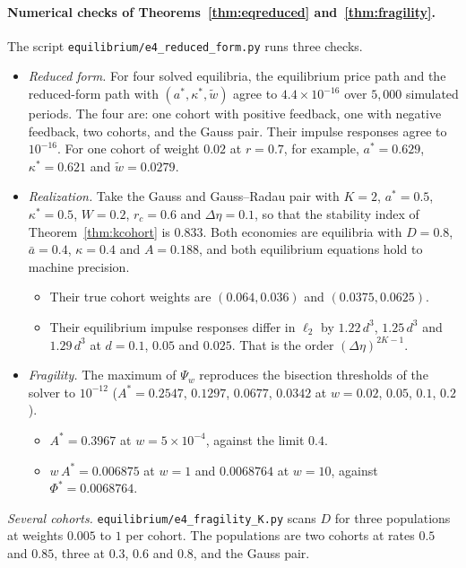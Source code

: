 \documentclass[12pt]{article}
\theoremstyle{definition}
\theoremstyle{remark}
\begin{document}
\paragraph{Numerical checks of Theorems~\ref{thm:eqreduced} and~\ref{thm:fragility}.} The script \nolinkurl{equilibrium/e4_reduced_form.py} runs three checks.
\begin{itemize}[itemsep=1pt,topsep=2pt]
\item \emph{Reduced form.} For four solved equilibria, the equilibrium price path and the reduced-form path with $(a^*,\kappa^*,\tilde w)$ agree to $4.4\times10^{-16}$ over $5{,}000$ simulated periods. The four are: one cohort with positive feedback, one with negative feedback, two cohorts, and the Gauss pair. Their impulse responses agree to $10^{-16}$. For one cohort of weight $0.02$ at $r=0.7$, for example, $a^*=0.629$, $\kappa^*=0.621$ and $\tilde w=0.0279$.
\item \emph{Realization.} Take the Gauss and Gauss--Radau pair with $K=2$, $a^*=0.5$, $\kappa^*=0.5$, $W=0.2$, $r_c=0.6$ and $\Delta\eta=0.1$, so that the stability index of Theorem~\ref{thm:kcohort} is $0.833$. Both economies are equilibria with $D=0.8$, $\bar a=0.4$, $\kappa=0.4$ and $A=0.188$, and both equilibrium equations hold to machine precision.
 \begin{itemize}[itemsep=1pt,topsep=2pt]
 \item Their true cohort weights are $(0.064,0.036)$ and $(0.0375,0.0625)$.
 \item Their equilibrium impulse responses differ in $\ell_2$ by $1.22\,d^3$, $1.25\,d^3$ and $1.29\,d^3$ at $d=0.1$, $0.05$ and $0.025$. That is the order $(\Delta\eta)^{2K-1}$.
 \end{itemize}
\item \emph{Fragility.} The maximum of $\Psi_w$ reproduces the bisection thresholds of the solver to $10^{-12}$ ($A^*=0.2547$, $0.1297$, $0.0677$, $0.0342$ at $w=0.02$, $0.05$, $0.1$, $0.2$).
 \begin{itemize}[itemsep=1pt,topsep=2pt]
 \item $A^*=0.3967$ at $w=5\times10^{-4}$, against the limit $0.4$.
 \item $w\,A^*=0.006875$ at $w=1$ and $0.0068764$ at $w=10$, against $\Phi^*=0.0068764$.
 \end{itemize}
\end{itemize}
\emph{Several cohorts.} \nolinkurl{equilibrium/e4_fragility_K.py} scans $D$ for three populations at weights $0.005$ to $1$ per cohort. The populations are two cohorts at rates $0.5$ and $0.85$, three at $0.3$, $0.6$ and $0.8$, and the Gauss pair.
\end{document}
